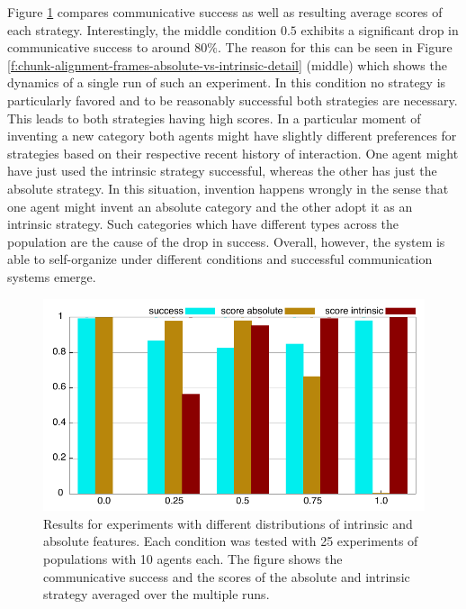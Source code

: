Figure \ref{f:chunk-alignment-frames-absolute-vs-intrinsic-bar-plot} compares communicative success
as well as resulting average scores of each strategy. Interestingly, the middle condition $0.5$ exhibits
a significant drop in communicative success to around $80\si{\percent}$. The reason for this can be seen in Figure 
\ref{f:chunk-alignment-frames-absolute-vs-intrinsic-detail} (middle) which shows the dynamics
of a single run of such an experiment. In this condition no strategy is particularly favored and to
be reasonably successful both strategies are necessary. This leads to both strategies having
high scores. In a particular moment of inventing a new category both agents might have slightly
different preferences for strategies based on their respective recent history of interaction.
One agent might have just used the intrinsic strategy successful, whereas the other has
just the absolute strategy. In this situation, invention happens wrongly in the sense that one
agent might invent an absolute category and the other adopt it as an intrinsic strategy.
Such categories which have different types across the population are the cause of the drop
in success. Overall, however, the system is able to self-organize under different conditions and successful
communication systems emerge.

\begin{figure}
\begin{center}
\includegraphics[width=1.0\columnwidth]{figs/chunk-alignment-frames-absolute-vs-intrinsic-bar-plot}
\end{center}
\caption[Comparison for different distributions of intrinsic and absolute features]{%
Results for experiments with different distributions of intrinsic and absolute features. Each condition
was tested with 25 experiments of populations with 10 agents each. The figure shows the 
communicative success and the scores of the absolute and intrinsic strategy averaged over the
multiple runs.}
\label{f:chunk-alignment-frames-absolute-vs-intrinsic-bar-plot}
\end{figure}


